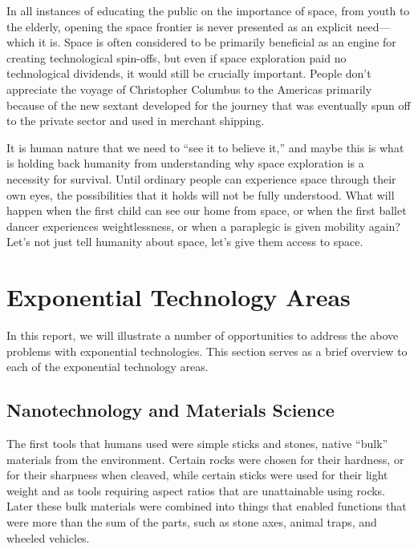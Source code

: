 \documentclass[letter,11pt]{article}
\begin{document}
In  all instances of educating the public on the importance of space, from  youth to the elderly, opening the space frontier is never presented as  an explicit need---which it is. Space is often considered to be  primarily beneficial as an engine for creating technological spin-offs,  but even if space exploration paid no technological dividends, it would  still be crucially important. People don't appreciate the voyage of  Christopher Columbus to the Americas primarily because of the new  sextant developed for the journey that was eventually spun off to the  private sector and used in merchant shipping.

It is human nature that we need to ``see it to believe it,'' and maybe this is what is holding back humanity  from understanding why space exploration is a necessity for survival.  Until ordinary people can experience space through their own eyes, the  possibilities that it holds will not be fully understood. What will  happen when the first child can see our home from space, or when the  first ballet dancer experiences weightlessness, or when a paraplegic is  given mobility again? Let's not just tell humanity about space, let's  give them access to space.



\section{Exponential Technology Areas}
\label{et-overview}

In this report, we will illustrate a number of opportunities to address the
above problems with exponential technologies. This section serves as a brief
overview to each of the exponential technology areas.

\subsection{Nanotechnology and Materials Science}
\label{et-nano}

The first tools that humans used were simple sticks and stones, native ``bulk''
materials from the environment. Certain rocks were chosen for their hardness,
or for their sharpness when cleaved, while certain sticks were used for their
light weight and as tools requiring aspect ratios that are unattainable using
rocks. Later these bulk materials were combined into things that enabled
functions that were more than the sum of the parts, such as stone axes, animal
traps, and wheeled vehicles.
\end{document}
